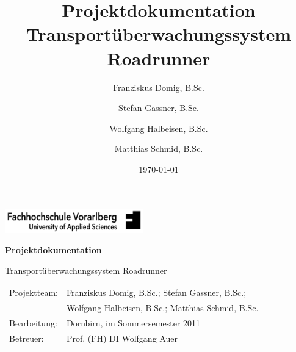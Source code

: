 \documentclass[11pt,a4paper]{article}
\title{
	Projektdokumentation\\
	Transportüberwachungssystem Roadrunner
}
\author{
	Franziskus Domig, B.Sc.\\
		\and
	Stefan Gassner, B.Sc.\\
		\and
	Wolfgang Halbeisen, B.Sc.\\
		\and
	Matthias Schmid, B.Sc.\\	
}
\date{\today}
\begin{document}
	

\pagestyle{empty} %

\begin{center}

\includegraphics[width=60mm]{files/logo-fhv.png}

\vspace{4cm}
{\large\textbf{Projektdokumentation}}\vspace{.5cm}

{\LARGE Transportüberwachungssystem Roadrunner}


\end{center}

\vspace{12cm}


\begin{tabular}{ll}
	Projektteam: & Franziskus Domig, B.Sc.; Stefan Gassner, B.Sc.;\\
	     	& Wolfgang Halbeisen, B.Sc.; Matthias Schmid, B.Sc.\\
	Bearbeitung: & Dornbirn, im Sommersemester 2011\\
	Betreuer:    & Prof. (FH) DI Wolfgang Auer\\
\end{tabular}


\clearpage
\pagestyle{fancy}
\setcounter{page}{1}



\clearpage
\tableofcontents

\clearpage
{}
\setcounter{page}{1}

\fancyfoot[CO]{\thepage}



\clearpage


\clearpage


\clearpage


\clearpage


\clearpage

\end{document}
